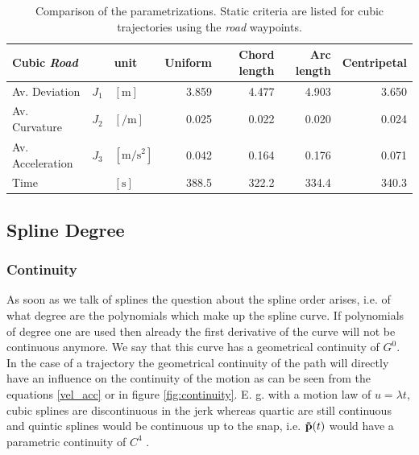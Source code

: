 \begin{table}[h]
\begin{center}
 \begin{tabular}{lll|rrrr}
 \hline
 Cubic \textit{Road} & & unit & Uniform & Chord length & Arc length & Centripetal \\ \hline \hline
 Av. Deviation  & $J_1$ & $[\si{\meter}]$    & 3.859 & 4.477 & 4.903 & 3.650 \\
 Av. Curvature & $J_2$ & $[\si{\per\meter}]$ & 0.025 & 0.022 & 0.020 & 0.024 \\
 Av. Acceleration  & $J_3$ & $[\si{\meter\per\square\second}]$ &  0.042 & 0.164 & 0.176 & 0.071 \\
 Time      &   & $[\si{\second}]$ &  388.5 & 322.2 & 334.4 & 340.3 \\
 \hline
 \end{tabular}
 \caption{Comparison of the parametrizations. Static criteria are listed for cubic trajectories using the \textit{road} waypoints.}\vspace{1ex}
 \label{tab:results_parameterization_road_cubic}
\end{center}
\end{table}

\subsection{Spline Degree}

\subsubsection{Continuity}
As soon as we talk of splines the question about the spline order arises, i.e. of what degree are the polynomials which make up the spline curve. If polynomials of degree one are used then already the first derivative of the curve will not be continuous anymore. We say that this curve has a geometrical continuity of $G^0$. In the case of a trajectory the geometrical continuity of the path will directly have an influence on the continuity of the motion as can be seen from the equations \eqref{vel_acc} or in figure \ref{fig:continuity}. E. g. with a motion law of $u=\lambda t$, cubic splines are discontinuous in the jerk whereas quartic are still continuous and quintic splines would be continuous up to the snap, i.e. ${\bf \tilde{p}}(t)$ would have a parametric continuity of $C^4$ . 

